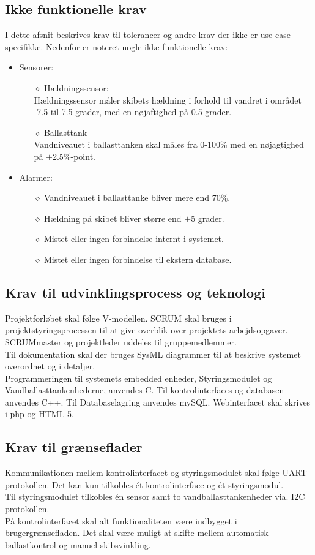 \subsection{Ikke funktionelle krav}
I dette afsnit beskrives krav til tolerancer og andre krav der ikke er use case specifikke. Nedenfor er noteret nogle ikke funktionelle krav:
\begin{itemize}
\item Sensorer:
\begin{itemize}
\item[$\diamond$] Hældningssensor:\\
Hældningssensor måler skibets hældning i forhold til vandret i området -7.5 til 7.5 grader, med en nøjaftighed på 0.5 grader.\\
\item[$\diamond$] Ballasttank\\
Vandniveauet i ballasttanken skal måles fra 0-100\% med en nøjagtighed på $\pm$2.5\%-point.
\end{itemize}
\item Alarmer:
\begin{itemize}
\item[$\diamond$]Vandniveauet i ballasttanke bliver mere end 70\%.
\item[$\diamond$]Hældning på skibet bliver større end $\pm$5 grader.
\item[$\diamond$]Mistet eller ingen forbindelse internt i systemet.
\item[$\diamond$]Mistet eller ingen forbindelse til ekstern database.
\end{itemize}
\end{itemize}
\subsection{Krav til udvinklingsprocess og teknologi}
Projektforløbet skal følge V-modellen. SCRUM skal bruges i projektstyringsprocessen til at give overblik over projektets arbejdsopgaver. SCRUMmaster og projektleder uddeles til gruppemedlemmer.\\
Til dokumentation skal der bruges SysML diagrammer til at beskrive systemet overordnet og i detaljer.\\
Programmeringen til systemets embedded enheder, Styringsmodulet og Vandballasttankenhederne, anvendes C. Til kontrolinterfaces og databasen anvendes C++. Til Databaselagring anvendes mySQL. Webinterfacet skal skrives i php og HTML 5.

\subsection{Krav til grænseflader}
Kommunikationen mellem kontrolinterfacet og styringsmodulet skal følge UART protokollen. Det kan kun tilkobles ét kontrolinterface og ét styringsmodul.\\
Til styringsmodulet tilkobles én sensor samt to vandballasttankenheder via. I2C protokollen.\\
På kontrolinterfacet skal alt funktionaliteten være indbygget i brugergrænsefladen. Det skal være muligt at skifte mellem automatisk ballastkontrol og manuel skibsvinkling. 

